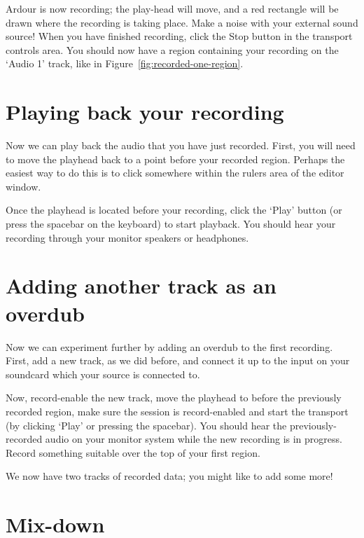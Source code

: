 \documentclass[10pt,a4paper]{book}
\newcommand{\screenshot}[3]{%
\begin{figure}[ht]%
\begin{center}
\texttt{[image: screenshots/\#1]}
\end{center}
\caption{#2}
\label{#3}
\end{figure}}
\begin{document}
Ardour is now recording; the play-head will move, and a red rectangle
will be drawn where the recording is taking place.  Make a noise with
your external sound source!  When you have finished recording, click
the Stop button in the transport controls area.  You should now have a
region containing your recording on the `Audio 1' track, like in
Figure~\ref{fig:recorded-one-region}.


\section{Playing back your recording}

Now we can play back the audio that you have just recorded.  First,
you will need to move the playhead back to a point before your
recorded region.  Perhaps the easiest way to do this is to click
somewhere within the rulers area of the editor window.


Once the playhead is located before your recording, click the `Play'
button (or press the spacebar on the keyboard) to start playback.  You
should hear your recording through your monitor speakers or
headphones.

\section{Adding another track as an overdub}

Now we can experiment further by adding an overdub to the first
recording.  First, add a new track, as we did before, and connect it
up to the input on your soundcard which your source is connected to.

Now, record-enable the new track, move the playhead to before the
previously recorded region, make sure the session is record-enabled
and start the transport (by clicking `Play' or pressing the spacebar).
You should hear the previously-recorded audio on your monitor system
while the new recording is in progress.  Record something suitable
over the top of your first region.

We now have two tracks of recorded data; you might like to add some
more!

\section{Mix-down}
\end{document}
